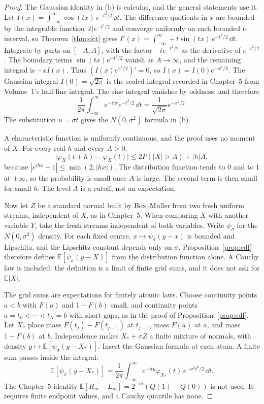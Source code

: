 \begin{proof}
The Gaussian identity in (b) is calculus, and the general statements use it. Let $I(x)=\int_{-\infty}^{\infty}\cos(tx)\,e^{-t^2/2}\,\dd t$. The difference quotients in $x$ are bounded by the integrable function $|t|e^{-t^2/2}$ and converge uniformly on each bounded $t$-interval, so Theorem~\ref{thm:dct} gives $I'(x)=\int_{-\infty}^{\infty}-t\sin(tx)\,e^{-t^2/2}\,\dd t$. Integrate by parts on $[-A,A]$, with the factor $-te^{-t^2/2}$ as the derivative of $e^{-t^2/2}$. The boundary terms $\sin(tx)e^{-t^2/2}$ vanish as $A\to\infty$, and the remaining integral is $-x I(x)$. Thus $(I(x)e^{x^2/2})'=0$, so $I(x)=I(0)e^{-x^2/2}$. The Gaussian integral $I(0)=\sqrt{2\pi}$ is the scaled integral recorded in Chapter~5 from Volume~1's half-line integral. The sine integral vanishes by oddness, and therefore
\[
 \frac1{2\pi}\int_{-\infty}^{\infty}e^{-itx}e^{-t^2/2}\,\dd t=\frac1{\sqrt{2\pi}}e^{-x^2/2}.
\]
The substitution $u=\sigma t$ gives the $N(0,\sigma^2)$ formula in (b).

A characteristic function is uniformly continuous, and the proof uses no moment of $X$. For every real $h$ and every $A>0$,
\[
 \bigl|\varphi_X(t+h)-\varphi_X(t)\bigr|\le 2P(|X|>A)+|h|A,
\]
because $|e^{ihx}-1|\le\min(2,|hx|)$. The distribution function tends to $0$ and to $1$ at $\pm\infty$, so the probability is small once $A$ is large. The second term is then small for small $h$. The level $A$ is a cutoff, not an expectation.

Now let $Z$ be a standard normal built by Box--Muller from two fresh uniform streams, independent of $X$, as in Chapter~5. When comparing $X$ with another variable $Y$, take the fresh streams independent of both variables. Write $\psi_\sigma$ for the $N(0,\sigma^2)$ density. For each fixed centre, $x\mapsto\psi_\sigma(y-x)$ is bounded and Lipschitz, and the Lipschitz constant depends only on $\sigma$. Proposition~\ref{prop:cdf} therefore defines $\mathbb E[\psi_\sigma(y-X)]$ from the distribution function alone. A Cauchy law is included: the definition is a limit of finite grid sums, and it does not ask for $\mathbb E|X|$.

The grid sums are expectations for finitely atomic laws. Choose continuity points $a<b$ with $F(a)$ and $1-F(b)$ small, and continuity points $a=t_0<\cdots<t_N=b$ with short gaps, as in the proof of Proposition~\ref{prop:cdf}. Let $X_*$ place mass $F(t_j)-F(t_{j-1})$ at $t_{j-1}$, mass $F(a)$ at $a$, and mass $1-F(b)$ at $b$. Independence makes $X_*+\sigma Z$ a finite mixture of normals, with density $y\mapsto\mathbb E[\psi_\sigma(y-X_*)]$. Insert the Gaussian formula at each atom. A finite sum passes inside the integral:
\[
 \mathbb E[\psi_\sigma(y-X_*)]
 =\frac1{2\pi}\int_{-\infty}^{\infty}e^{-ity}\varphi_{X_*}(t)\,e^{-\sigma^2 t^2/2}\,\dd t.
\]
The Chapter~5 identity $\mathbb E[R_m-L_m]=2^{-m}(Q(1)-Q(0))$ is not used. It requires finite endpoint values, and a Cauchy quantile has none.


\end{proof}
